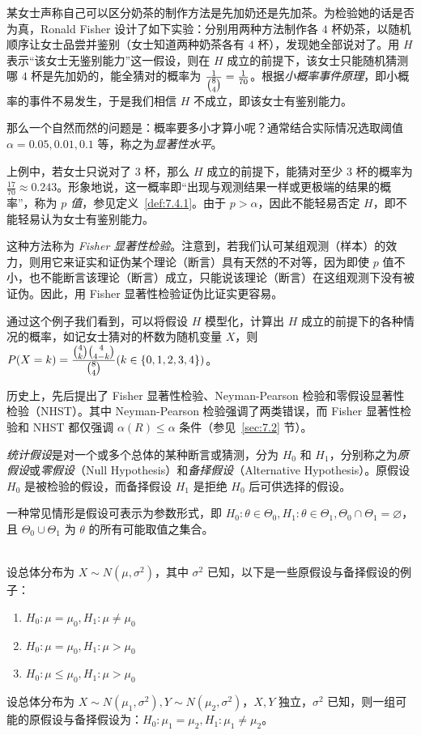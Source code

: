 \documentclass[../main.tex]{subfiles}
\begin{document}
\begin{example}
    某女士声称自己可以区分奶茶的制作方法是先加奶还是先加茶。为检验她的话是否为真，Ronald Fisher 设计了如下实验：分别用两种方法制作各 $4$ 杯奶茶，以随机顺序让女士品尝并鉴别（女士知道两种奶茶各有 $4$ 杯），发现她全部说对了。用 $H$ 表示“该女士无鉴别能力”这一假设，则在 $H$ 成立的前提下，该女士只能随机猜测哪 $4$ 杯是先加奶的，能全猜对的概率为 $\frac1{\tbinom 84}=\frac 1{70}$。根据\emph{小概率事件原理}，即小概率的事件不易发生，于是我们相信 $H$ 不成立，即该女士有鉴别能力。
\end{example}

那么一个自然而然的问题是：概率要多小才算小呢？通常结合实际情况选取阈值 $\alpha=0.05,0.01,0.1$ 等，称之为\emph{显著性水平}。

上例中，若女士只说对了 $3$ 杯，那么 $H$ 成立的前提下，能猜对至少 $3$ 杯的概率为 $\frac{17}{70}\approx0.243$。形象地说，这一概率即“出现与观测结果一样或更极端的结果的概率”，称为 \emph{$p$ 值}，参见定义~\ref{def:7.4.1}。由于 $p>\alpha$，因此不能轻易否定 $H$，即不能轻易认为女士有鉴别能力。

这种方法称为 \emph{Fisher 显著性检验}。注意到，若我们认可某组观测（样本）的效力，则用它来证实和证伪某个理论（断言）具有天然的不对等，因为即使 $p$ 值不小，也不能断言该理论（断言）成立，只能说该理论（断言）在这组观测下没有被证伪。因此，用 Fisher 显著性检验证伪比证实更容易。

通过这个例子我们看到，可以将假设 $H$ 模型化，计算出 $H$ 成立的前提下的各种情况的概率，如记女士猜对的杯数为随机变量 $X$，则 $P(X=k)=\frac{\tbinom 4k\tbinom 4{4-k}}{\tbinom 84}(k\in\{0,1,2,3,4\})$。

历史上，先后提出了 Fisher 显著性检验、Neyman-Pearson 检验和零假设显著性检验（NHST）。其中 Neyman-Pearson 检验强调了两类错误，而 Fisher 显著性检验和 NHST 都仅强调 $\alpha(R)\leq\alpha$ 条件（参见~\ref{sec:7.2} 节）。

\emph{统计假设}是对一个或多个总体的某种断言或猜测，分为 $H_0$ 和 $H_1$，分别称之为\emph{原假设}或\emph{零假设}（Null Hypothesis）和\emph{备择假设}（Alternative Hypothesis）。原假设 $H_0$ 是被检验的假设，而备择假设 $H_1$ 是拒绝 $H_0$ 后可供选择的假设。

一种常见情形是假设可表示为参数形式，即 $H_0:\theta\in\Theta_0,H_1:\theta\in\Theta_1,\Theta_0\cap\Theta_1=\varnothing$，且 $\Theta_0\cup\Theta_1$ 为 $\theta$ 的所有可能取值之集合。

\begin{example}
    \mbox{}\\
    设总体分布为 $X\sim N(\mu,\sigma^2)$，其中 $\sigma^2$ 已知，以下是一些原假设与备择假设的例子：
    \begin{enumerate}
        \item $H_0:\mu=\mu_0,H_1:\mu\neq\mu_0$
        \item $H_0:\mu=\mu_0,H_1:\mu>\mu_0$
        \item $H_0:\mu\leq\mu_0,H_1:\mu>\mu_0$
    \end{enumerate}
    设总体分布为 $X\sim N(\mu_1,\sigma^2),Y\sim N(\mu_2,\sigma^2)$，$X,Y$ 独立，$\sigma^2$ 已知，则一组可能的原假设与备择假设为：$H_0:\mu_1=\mu_2,H_1:\mu_1\neq\mu_2$。
\end{example}
\end{document}

